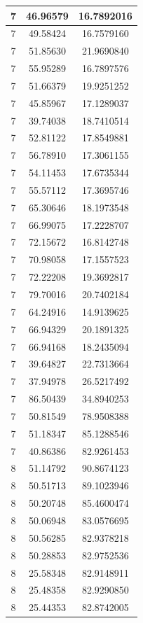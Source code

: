 \documentclass[
]{book}
\begin{document}
\begin{tabular}{c|c|c}
\hline
7 & 46.96579 & 16.7892016\\
\hline
7 & 49.58424 & 16.7579160\\
\hline
7 & 51.85630 & 21.9690840\\
\hline
7 & 55.95289 & 16.7897576\\
\hline
7 & 51.66379 & 19.9251252\\
\hline
7 & 45.85967 & 17.1289037\\
\hline
7 & 39.74038 & 18.7410514\\
\hline
7 & 52.81122 & 17.8549881\\
\hline
7 & 56.78910 & 17.3061155\\
\hline
7 & 54.11453 & 17.6735344\\
\hline
7 & 55.57112 & 17.3695746\\
\hline
7 & 65.30646 & 18.1973548\\
\hline
7 & 66.99075 & 17.2228707\\
\hline
7 & 72.15672 & 16.8142748\\
\hline
7 & 70.98058 & 17.1557523\\
\hline
7 & 72.22208 & 19.3692817\\
\hline
7 & 79.70016 & 20.7402184\\
\hline
7 & 64.24916 & 14.9139625\\
\hline
7 & 66.94329 & 20.1891325\\
\hline
7 & 66.94168 & 18.2435094\\
\hline
7 & 39.64827 & 22.7313664\\
\hline
7 & 37.94978 & 26.5217492\\
\hline
7 & 86.50439 & 34.8940253\\
\hline
7 & 50.81549 & 78.9508388\\
\hline
7 & 51.18347 & 85.1288546\\
\hline
7 & 40.86386 & 82.9261453\\
\hline
8 & 51.14792 & 90.8674123\\
\hline
8 & 50.51713 & 89.1023946\\
\hline
8 & 50.20748 & 85.4600474\\
\hline
8 & 50.06948 & 83.0576695\\
\hline
8 & 50.56285 & 82.9378218\\
\hline
8 & 50.28853 & 82.9752536\\
\hline
8 & 25.58348 & 82.9148911\\
\hline
8 & 25.48358 & 82.9290850\\
\hline
8 & 25.44353 & 82.8742005\\

\end{tabular}
\end{document}
